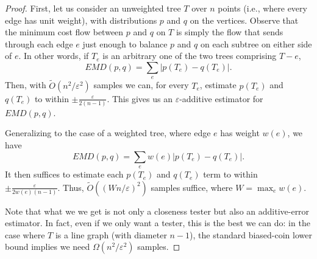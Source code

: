 \documentclass[11pt]{article}
\newcommand{\eps}{\varepsilon}
\newcommand{\tO}{\tilde{O}}
\begin{document}
\begin{proof}
First, let us consider an unweighted tree $T$ over $n$ points (i.e., where
every edge has unit weight), with distributions $p$ and $q$ on the
vertices. Observe that the minimum cost flow between $p$ and $q$ on $T$ is
simply the flow that sends through each edge $e$ just enough to balance $p$
and $q$ on each subtree on either side of $e$. In other words, if $T_e$ is
an arbitrary one of the two trees comprising $T-e$,
\[
        EMD(p,q) = \sum_e |p(T_e) - q(T_e)|.
\]
Then, with $\tO(n^2/\eps^2)$ samples we can, for every $T_e$, estimate
$p(T_e)$ and $q(T_e)$ to within $\pm \frac{\eps}{2(n-1)}$. This
gives us an $\eps$-additive estimator for $EMD(p,q)$.

Generalizing to the case of a weighted tree, where edge $e$ has weight
$w(e)$, we have
\[
        EMD(p,q) = \sum_e w(e)|p(T_e) - q(T_e)|.
\]
It then suffices to estimate each $p(T_e)$ and $q(T_e)$ term to within
$\pm \frac{\eps}{2w(e)(n-1)}$. Thus, $\tO((Wn/\eps)^2)$ samples
suffice, where $W = \max_e w(e)$.

Note that what we we get is
not only a closeness tester but also an additive-error estimator.
In fact, even if we only want a tester, this is the best we can do: in the case where $T$ is a line graph (with diameter $n-1$), the standard biased-coin lower bound implies we need $\Omega(n^2/\eps^2)$ samples.
\end{proof}
\end{document}
